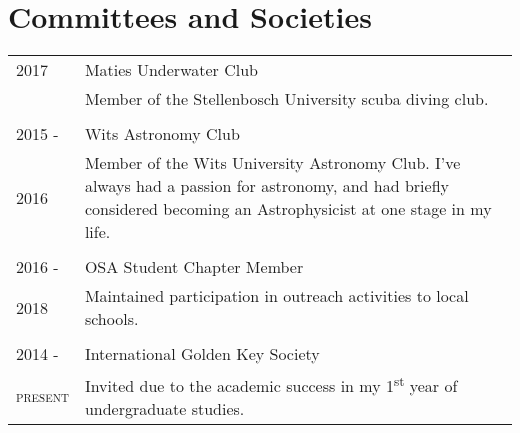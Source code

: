 \section{Committees and Societies}

\begin{tabular}{lp{12cm}}
	2017 & Maties Underwater Club \\
	& \small{Member of the Stellenbosch University scuba diving club.} \\
	& \\
	2015 - & Wits Astronomy Club \\
	2016& \small{Member of the Wits University Astronomy Club. I've always had a passion for astronomy, and had briefly considered becoming an Astrophysicist at one stage in my life.} \\
	& \\
	2016 - & OSA Student Chapter Member \\
	2018 & \small{Maintained participation in outreach activities to local schools.} \\
	& \\
	2014 - & International Golden Key Society \\
	\textsc{present} & \small{Invited due to the academic success in my 1\textsuperscript{st} year of undergraduate studies.}
\end{tabular}